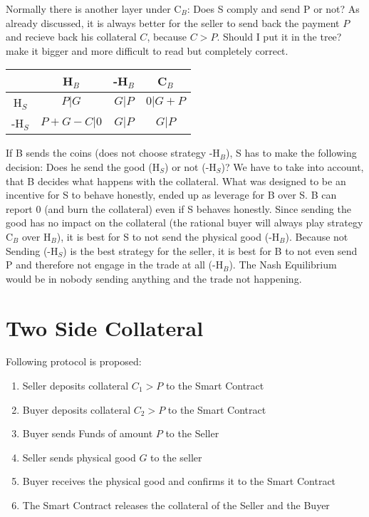 \documentclass{cacthesis}
\begin{document}
Normally there is another layer under C$_B$: Does S comply and send P or not? As already discussed, it is always better for the seller to send back the payment $P$ and recieve back his collateral $C$, because $C>P$. Should I put it in the tree? make it bigger and more difficult to read but completely correct.
\begin{center}
\begin{tabular}{ c||c|c|c| }
& H$_B$ & -H$_B$ & C$_B$  \\
\hline
\hline
H$_S$ & $P | G$ & $G | P$ & $0 | G + P$ \\
\hline
-H$_S$ & $P + G - C | 0$ & $G | P$ & $G | P$ \\ 
\hline
\end{tabular}
\end{center}
If B sends the coins (does not choose strategy -H$_B$), S has to make the following decision: Does he send the good (H$_S$) or not (-H$_S$)? We have to take into account, that B decides what happens with the collateral. \newline
What was designed to be an incentive for S to behave honestly, ended up as leverage for B over S. B can report 0 (and burn the collateral) even if S behaves honestly. 
Since sending the good has no impact on the collateral (the rational buyer will always play strategy C$_B$ over H$_B$), it is best for S to not send the physical good (-H$_B$).
Because not Sending (-H$_S$) is the best strategy for the seller, it is best for B to not even send P and therefore not engage in the trade at all (-H$_B$).\newline
The Nash Equilibrium would be in nobody sending anything and the trade not happening.


\section{Two Side Collateral}
Following protocol is proposed:
\begin{enumerate}
    \item Seller  deposits collateral $C_1 > P$ to the Smart Contract
    \item Buyer  deposits collateral $C_2 > P$ to the Smart Contract
    \item Buyer sends Funds of amount $P$ to the Seller
    \item Seller sends physical good $G$ to the seller 
    \item Buyer receives the physical good and confirms it to the Smart Contract
    \item The Smart Contract releases the collateral of the Seller and the Buyer
\end{enumerate}
\end{document}
